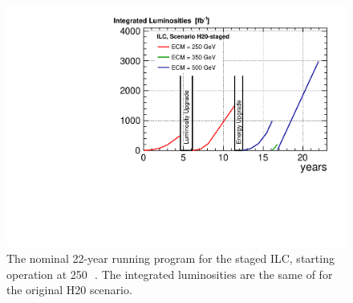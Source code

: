 \begin{figure}
\begin{center}
\includegraphics[width=0.75\hsize]{chapters/figures/lumi_H20-staged}
\end{center}
\caption{The nominal 22-year running program for the staged ILC, starting operation at 250\,\GeV ~\cite{ILC250}. The integrated luminosities are the same of for the original H20 scenario.}
\label{fig:H20staged}
\end{figure}
